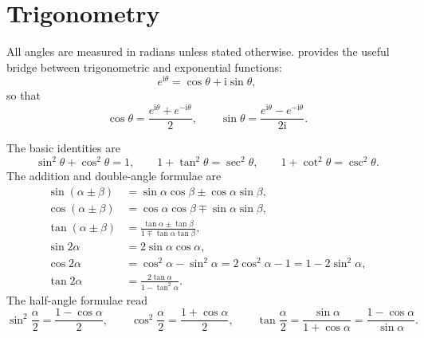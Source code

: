 \section{Trigonometry}

All angles are measured in radians unless stated otherwise.  provides the useful bridge between trigonometric and exponential functions:
\begin{equation}
e^{\mathrm{i}\theta}=\cos\theta+\mathrm{i}\sin\theta,
\end{equation}
so that
\begin{equation}
\cos\theta=\frac{e^{\mathrm{i}\theta}+e^{-\mathrm{i}\theta}}{2},
\qquad
\sin\theta=\frac{e^{\mathrm{i}\theta}-e^{-\mathrm{i}\theta}}{2\mathrm{i}}.
\end{equation}

The basic identities are
\begin{equation}
\sin^2\theta+\cos^2\theta=1,
\qquad
1+\tan^2\theta=\sec^2\theta,
\qquad
1+\cot^2\theta=\csc^2\theta.
\end{equation}
The addition and double-angle formulae are
\begin{align}
\sin(\alpha\pm\beta)&=\sin\alpha\cos\beta\pm\cos\alpha\sin\beta,\\
\cos(\alpha\pm\beta)&=\cos\alpha\cos\beta\mp\sin\alpha\sin\beta,\\
\tan(\alpha\pm\beta)&=\frac{\tan\alpha\pm\tan\beta}{1\mp\tan\alpha\tan\beta},\\
\sin 2\alpha&=2\sin\alpha\cos\alpha,\\
\cos 2\alpha&=\cos^2\alpha-\sin^2\alpha=2\cos^2\alpha-1=1-2\sin^2\alpha,\\
\tan 2\alpha&=\frac{2\tan\alpha}{1-\tan^2\alpha}.
\end{align}
The half-angle formulae read
\begin{equation}
\sin^2\frac{\alpha}{2}=\frac{1-\cos\alpha}{2},
\qquad
\cos^2\frac{\alpha}{2}=\frac{1+\cos\alpha}{2},
\qquad
\tan\frac{\alpha}{2}=\frac{\sin\alpha}{1+\cos\alpha}=\frac{1-\cos\alpha}{\sin\alpha}.
\end{equation}

